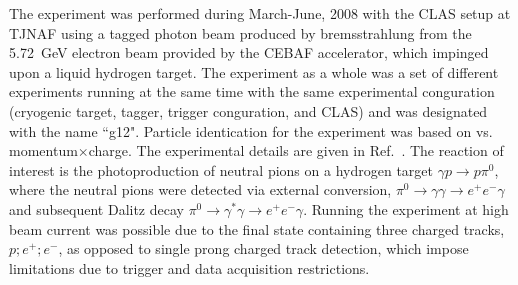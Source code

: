 \documentclass[aps,prc,twocolumn,floatfix,showpacs,preprintnumbers,amsmath,amssymb,superscriptaddress,linenumbers]{revtex4-1}
\begin{document}

The experiment was performed during March-June, 2008
with the CLAS setup at TJNAF using a tagged photon beam produced by 
bremsstrahlung from the 5.72~GeV electron beam provided by the CEBAF 
accelerator, which impinged upon a liquid hydrogen target. 
The experiment as a whole was a set of different 
experiments running at the same time with the same experimental 
conguration (cryogenic target, tagger, trigger conguration, and CLAS) 
and was designated with the name ``g12". Particle identication for 
the experiment was based on  vs. momentum$\times$charge.
The experimental details are given in Ref.~\cite{g12}. The reaction 
of interest is the photoproduction of neutral pions on a hydrogen 
target $\gamma p\rightarrow p\pi^0$, where the neutral pions were 
detected via external conversion, $\pi^0 \rightarrow\gamma\gamma 
\rightarrow e^+e^-\gamma$ and subsequent Dalitz decay $\pi^0
\rightarrow\gamma^\ast\gamma\rightarrow e^+e^-\gamma$. Running the 
experiment at high beam current was possible due to the final state 
containing three charged tracks, $p;e^+;e^-$, as opposed to single 
prong charged track detection, which impose limitations due to trigger 
and data acquisition restrictions.

\end{document}

